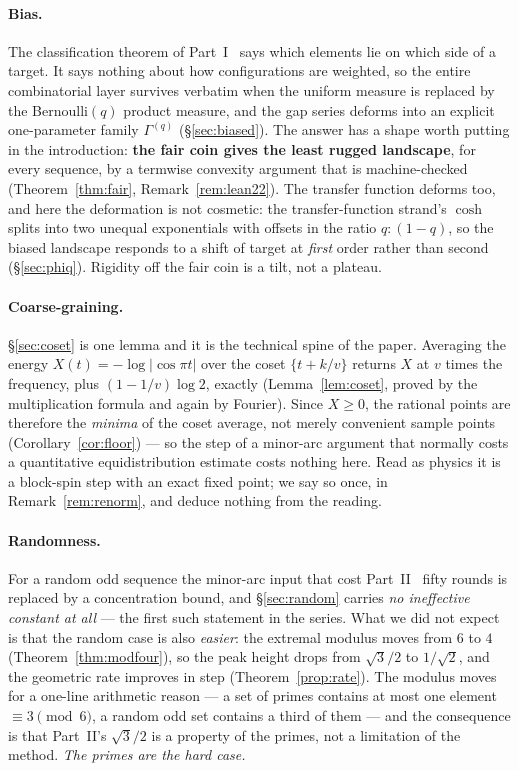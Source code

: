 \documentclass[11pt,a4paper]{article}
\theoremstyle{plain}
\theoremstyle{definition}
\theoremstyle{remark}
\begin{document}
\paragraph{Bias.} The classification theorem of Part~I~\cite{P1} says which elements lie on which side
of a target. It says nothing about how configurations are weighted, so the entire
combinatorial layer survives verbatim when the uniform measure is replaced by the
Bernoulli$(q)$ product measure, and the gap series deforms into an explicit one-parameter
family $\Gamma^{(q)}$ (\S\ref{sec:biased}). The answer has a shape worth putting in the
introduction: \textbf{the fair coin gives the least rugged landscape}, for every sequence, by
a termwise convexity argument that is machine-checked (Theorem~\ref{thm:fair},
Remark~\ref{rem:lean22}). The transfer function deforms too, and here the deformation is not
cosmetic: the transfer-function strand's $\cosh$ splits into two unequal exponentials with offsets in the ratio
$q:(1-q)$, so the biased landscape responds to a shift of target at \emph{first} order rather
than second (\S\ref{sec:phiq}). Rigidity off the fair coin is a tilt, not a plateau.

\paragraph{Coarse-graining.} \S\ref{sec:coset} is one lemma and it is the technical spine of the
paper. Averaging the energy $X(t)=-\log|\cos\pi t|$ over the coset $\{t+k/v\}$ returns
$X$ at $v$ times the frequency, plus $(1-1/v)\log2$, exactly (Lemma~\ref{lem:coset}, proved by
the multiplication formula and again by Fourier). Since $X\ge0$, the rational points are
therefore the \emph{minima} of the coset average, not merely convenient sample points
(Corollary~\ref{cor:floor}) --- so the step of a minor-arc argument that normally costs a
quantitative equidistribution estimate costs nothing here. Read as physics it is a block-spin
step with an exact fixed point; we say so once, in Remark~\ref{rem:renorm}, and deduce nothing
from the reading.

\paragraph{Randomness.} For a random odd sequence the minor-arc input that cost Part~II~\cite{P2} fifty
rounds is replaced by a concentration bound, and \S\ref{sec:random} carries
\emph{no ineffective constant at all} --- the first such statement in the series. What we did
not expect is that the random case is also \emph{easier}: the extremal modulus moves from $6$
to $4$ (Theorem~\ref{thm:modfour}), so the peak height drops from $\sqrt3/2$ to $1/\sqrt2$, and
the geometric rate improves in step (Theorem~\ref{prop:rate}). The modulus moves for a
one-line arithmetic reason --- a set of primes contains at most one element
$\equiv3\pmod6$, a random odd set contains a third of them --- and the consequence is that
Part~II's $\sqrt3/2$ is a property of the primes, not a limitation of the method.
\emph{The primes are the hard case.}
\end{document}

